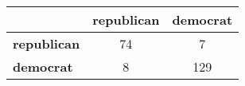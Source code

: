\begin{tabular}{l|cc}
\toprule
&\textbf{republican} & \textbf{democrat}\\
\midrule
\textbf{republican} & 74 & 7\\
\textbf{democrat} & 8 & 129\\
\bottomrule
\end{tabular}
